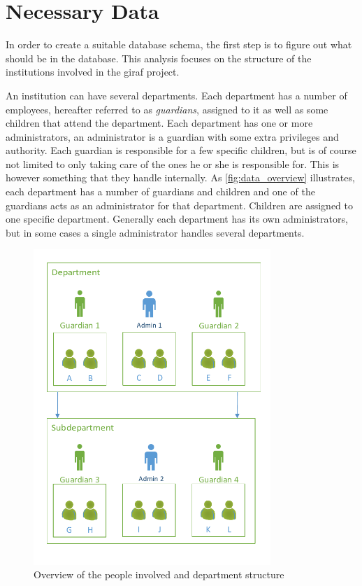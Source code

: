 \section{Necessary Data}
In order to create a suitable database schema, the first step is to figure out what should be in the database.
This analysis focuses on the structure of the institutions involved in the \ac{giraf} project. 

An institution can have several departments. Each department has a number of employees, hereafter referred to as
\emph{guardians}, assigned to it as well as some children that attend the department. Each department has one or
more administrators, an administrator is a guardian with some extra privileges and authority. Each guardian is
responsible for a few specific children, but is of course not limited to only taking care of the ones he or she
is responsible for. This is however something that they handle internally. As \autoref{fig:data_overview}
illustrates, each department has a number of guardians and children and one of the guardians acts as an
administrator for that department. Children are assigned to one specific department. Generally each department
has its own administrators, but in some cases a single administrator handles several departments.

\begin{figure}[hptb]
	\begin{center}
	\includegraphics[width=0.8\textwidth]{img/data_overview.pdf}
	\caption{Overview of the people involved and department structure}
	\label{fig:data_overview}
	\end{center}
\end{figure} 

